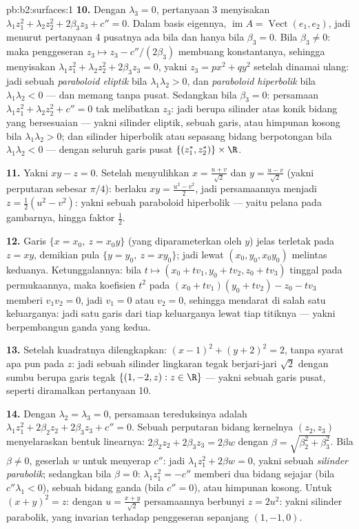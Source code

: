 \begin{solution}{pb:b2:surfaces:1}
\textbf{10.} Dengan $\lambda_3 = 0$, pertanyaan 3 menyisakan
$\lambda_1z_1^2 + \lambda_2z_2^2 + 2\beta_3z_3 + c'' = 0$. Dalam
basis eigennya, $\operatorname{im}A = \operatorname{Vect}(e_1,
e_2)$, jadi menurut pertanyaan 4 pusatnya ada bila dan hanya bila $\beta_3 = 0$. Bila
$\beta_3 \neq 0$: maka penggeseran $z_3 \mapsto z_3 -
c''/(2\beta_3)$ membuang konstantanya, sehingga menyisakan $\lambda_1z_1^2
+ \lambda_2z_2^2 + 2\beta_3z_3 = 0$, yakni $z_3 = px^2 +
qy^2$ setelah dinamai ulang: jadi sebuah \emph{paraboloid eliptik} bila
$\lambda_1\lambda_2 > 0$, dan \emph{paraboloid hiperbolik} bila
$\lambda_1\lambda_2 < 0$ --- dan memang tanpa pusat. Sedangkan bila
$\beta_3 = 0$: persamaan $\lambda_1z_1^2 + \lambda_2z_2^2 +
c'' = 0$ tak melibatkan $z_3$: jadi  berupa silinder
atas konik bidang yang bersesuaian --- yakni silinder eliptik,
sebuah garis, atau himpunan kosong bila $\lambda_1\lambda_2 > 0$; dan silinder
hiperbolik atau sepasang bidang berpotongan bila
$\lambda_1\lambda_2 < 0$ --- dengan seluruh garis pusat
$\{(z_1^*, z_2^*)\} \times \R$.

\textbf{11.} Yakni $xy - z = 0$. Setelah menyulihkan $x = \frac{u +
v}{\sqrt2}$ dan $y = \frac{u - v}{\sqrt2}$ (yakni perputaran sebesar $\pi/4$):
berlaku $xy = \frac{u^2 - v^2}2$, jadi persamaannya menjadi $z =
\frac12(u^2 - v^2)$: yakni sebuah paraboloid hiperbolik --- yaitu pelana
pada gambarnya, hingga faktor $\frac12$.

\textbf{12.} Garis $\{x = x_0,\ z = x_0y\}$ (yang diparameterkan
oleh $y$) jelas terletak pada $z = xy$, demikian pula $\{y = y_0,\ z =
xy_0\}$; jadi lewat $(x_0, y_0, x_0y_0)$ melintas keduanya.
Ketunggalannya: bila $t \mapsto (x_0 + tv_1, y_0 + tv_2, z_0 +
tv_3)$ tinggal pada permukaannya, maka koefisien $t^2$ pada $(x_0
+ tv_1)(y_0 + tv_2) - z_0 - tv_3$ memberi $v_1v_2 = 0$, jadi
$v_1 = 0$ atau $v_2 = 0$, sehingga mendarat di salah satu keluarganya:
jadi satu garis dari tiap keluarganya lewat tiap titiknya --- yakni 
berpembangun ganda yang kedua.

\textbf{13.} Setelah kuadratnya dilengkapkan: $(x - 1)^2 + (y + 2)^2 = 2$,
tanpa syarat apa pun pada $z$: jadi sebuah silinder lingkaran tegak berjari-jari
$\sqrt2$ dengan sumbu berupa garis tegak $\{(1, -2, z) : z \in
\R\}$ --- yakni sebuah garis pusat, seperti diramalkan pertanyaan 10.

\textbf{14.} Dengan $\lambda_2 = \lambda_3 = 0$, persamaan
tereduksinya adalah $\lambda_1z_1^2 + 2\beta_2z_2 + 2\beta_3z_3 + c''
= 0$. Sebuah perputaran bidang kernelnya $(z_2, z_3)$ menyelaraskan
bentuk linearnya: $2\beta_2z_2 + 2\beta_3z_3 = 2\beta w$ dengan
$\beta = \sqrt{\beta_2^2 + \beta_3^2}$. Bila $\beta \neq 0$,
geserlah $w$ untuk menyerap $c''$: jadi $\lambda_1z_1^2 + 2\beta w =
0$, yakni sebuah \emph{silinder parabolik}; sedangkan bila $\beta = 0$:
$\lambda_1z_1^2 = -c''$ memberi dua bidang sejajar (bila $c''
\lambda_1 < 0$), sebuah bidang ganda (bila $c'' = 0$), atau himpunan
kosong. Untuk $(x + y)^2 = z$: dengan $u = \frac{x + y}{\sqrt2}$
persamaannya berbunyi $z = 2u^2$: yakni silinder parabolik, yang invarian
terhadap penggeseran sepanjang $(1, -1, 0)$.


\end{solution}
